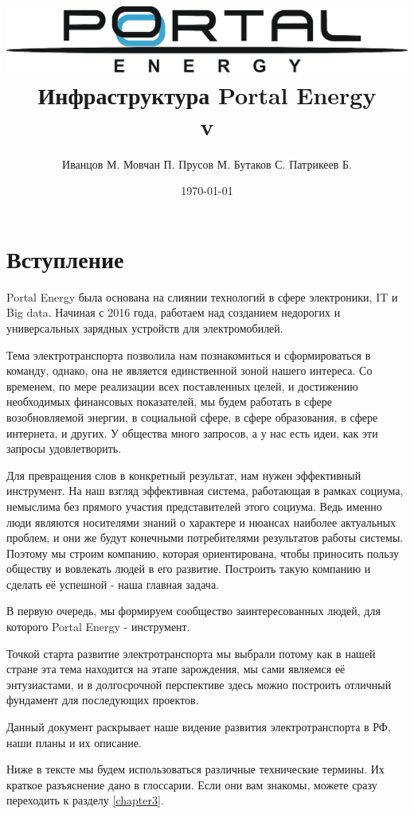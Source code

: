 \documentclass[a4paper,12pt]{report}
\title{\includegraphics[width=14cm]{logo}\\[2cm]Инфраструктура Portal Energy \\\normalsize v\versionnumber}
\author{Иванцов М. Мовчан П. Прусов М. Бутаков С. Патрикеев Б.}
\date{\today}
\begin{document}
%
\maketitle
\tableofcontents
\clearpage


\chapter{Вступление}

Portal Energy была основана на слиянии технологий в сфере электроники, IT и Big data. Начиная с 2016 года, работаем над созданием недорогих и универсальных зарядных устройств для электромобилей. 

Тема электротранспорта позволила нам познакомиться и сформироваться в команду, однако, она не является единственной зоной нашего интереса. Со временем, по мере реализации всех поставленных целей, и достижению необходимых финансовых показателей, мы будем работать в сфере возобновляемой энергии, в социальной сфере, в сфере образования, в сфере интернета, и других. У общества много запросов, а у нас есть идеи, как эти запросы удовлетворить. 

Для превращения слов в конкретный результат, нам нужен эффективный инструмент. На наш взгляд эффективная система, работающая в рамках социума, немыслима без прямого участия представителей этого социума. Ведь именно люди являются носителями знаний о характере и нюансах наиболее актуальных проблем, и они же будут конечными потребителями результатов работы системы. Поэтому мы строим компанию, которая ориентирована, чтобы приносить пользу обществу и вовлекать людей в его развитие. Построить такую компанию и сделать её успешной - наша главная задача. 

В первую очередь, мы формируем сообщество заинтересованных людей, для которого Portal Energy -  инструмент.

Точкой старта развитие электротранспорта мы выбрали потому как в нашей стране эта тема находится на этапе зарождения, мы сами являемся её энтузиастами, и в долгосрочной перспективе здесь можно построить отличный фундамент для последующих проектов. 

Данный документ раскрывает наше видение развития электротранспорта в РФ, наши планы и их описание.



Ниже в тексте мы будем использоваться различные технические термины. Их краткое разъяснение дано в глоссарии. Если они вам знакомы, можете сразу переходить к разделу \ref{chapter3}.
\end{document}
